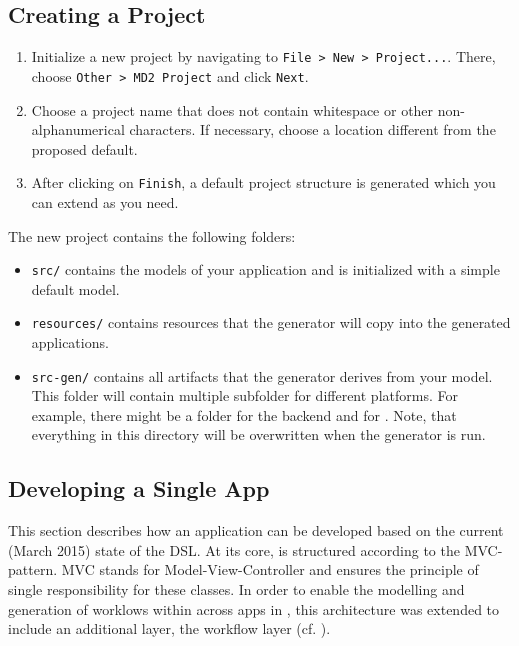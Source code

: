\subsection{Creating a Project}
\begin{enumerate}
\item  Initialize a new project by navigating to \lstinline[language=Simple]|File > New > Project...|. There, choose \lstinline[language=Simple]|Other > MD2 Project| and click \lstinline|Next|.
\item Choose a project name that does not contain whitespace or other non-alphanumerical characters. If necessary, choose a location different from the proposed default.
\item After clicking on \lstinline|Finish|, a default project structure is generated which you can extend as you need.
\end{enumerate}

The new project contains the following folders:

\begin{itemize}
\item \lstinline[language=Simple]|src/| contains the \MD models of your application and is initialized with a simple default model.
\item \lstinline[language=Simple]|resources/| contains resources that the generator will copy into the generated applications.
\item \lstinline[language=Simple]|src-gen/| contains all artifacts that the generator derives from your model. This folder will contain multiple subfolder for different platforms. For example, there might be a folder for the backend and for \mapapps. Note, that everything in this directory will be overwritten when the generator is run.
\end{itemize}

\subsection{Developing a Single App} 
\label{subsec:SingleAppDev}
This section describes how an application can be developed based on the current (March 2015) state of the \MD DSL. At its core, \MD is structured according to the MVC-pattern. MVC stands for Model-View-Controller and ensures the principle of single responsibility for these classes. In order to enable the modelling and generation of worklows within across apps in \MD, this architecture was extended to include an additional layer, the workflow layer (cf. ).

